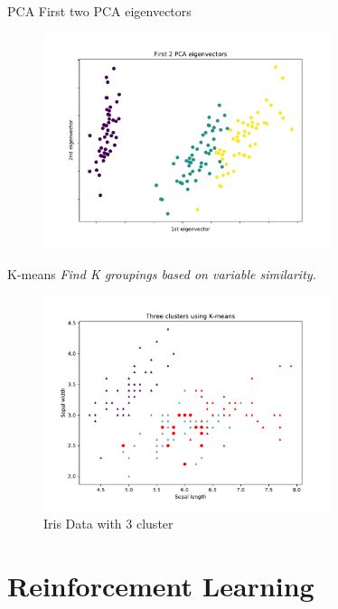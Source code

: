 \documentclass[10pt]{beamer}
\begin{document}
\begin{frame}{PCA}
First two PCA eigenvectors
		\begin{figure}	
			\includegraphics[width=0.75\textwidth, center, trim=0cm 0cm 0 0cm]{images/Iris_PCA.pdf}
	\end{figure}
\end{frame}

\begin{frame}{K-means}
\emph{Find K groupings based on variable similarity.}
		\begin{figure}
			\caption{Iris Data with 3 cluster}
			\includegraphics[width=0.75\textwidth, center, trim=0cm 0cm 0 0cm]{images/Iris_3means.pdf}
	\end{figure}
\end{frame}

\section{Reinforcement Learning}
\end{document}
